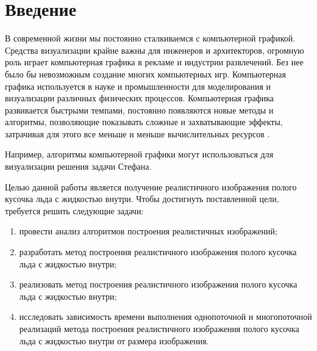 \chapter*{Введение}

В современной жизни мы постоянно сталкиваемся с компьютерной графикой. Средства визуализации крайне важны для инженеров и архитекторов, огромную роль играет компьютерная графика в рекламе и индустрии развлечений. Без нее было бы невозможным создание многих компьютерных игр. Компьютерная графика используется в науке и промышленности для моделирования и визуализации различных физических процессов. Компьютерная графика развивается быстрыми темпами, постоянно появляются новые методы и алгоритмы, позволяющие показывать сложные и захватывающие эффекты, затрачивая для этого все меньше и меньше вычислительных ресурсов \cite{boreskov}.

 Например, алгоритмы компьютерной графики могут использоваться для визуализации решения задачи Стефана.

Целью данной работы является получение реалистичного изображения полого кусочка льда с жидкостью внутри.
Чтобы достигнуть поставленной цели, требуется решить следующие задачи:
\begin{enumerate}[label=\arabic*)]
    \item провести анализ алгоритмов построения реалистичных изображений;
    \item разработать метод построения реалистичного изображения полого кусочка льда с жидкостью внутри;
    \item реализовать метод построения реалистичного изображения полого кусочка льда с жидкостью внутри;
    \item исследовать зависимость времени выполнения однопоточной и многопоточной реализаций метода построения реалистичного изображения полого кусочка льда с жидкостью внутри от размера изображения.
\end{enumerate}
